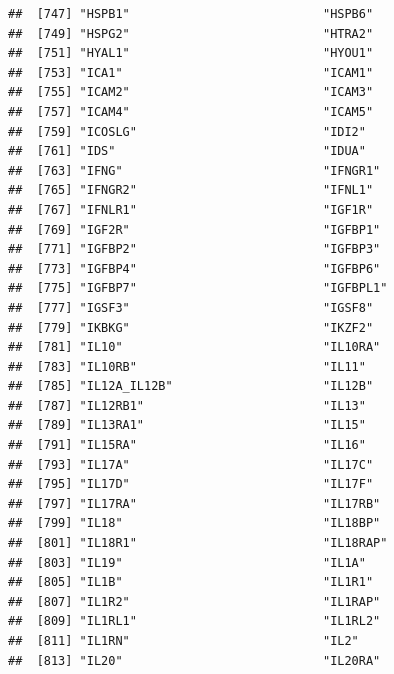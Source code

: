 \documentclass[
]{article}
\begin{document}
\begin{verbatim}
##  [747] "HSPB1"                           "HSPB6"                          
##  [749] "HSPG2"                           "HTRA2"                          
##  [751] "HYAL1"                           "HYOU1"                          
##  [753] "ICA1"                            "ICAM1"                          
##  [755] "ICAM2"                           "ICAM3"                          
##  [757] "ICAM4"                           "ICAM5"                          
##  [759] "ICOSLG"                          "IDI2"                           
##  [761] "IDS"                             "IDUA"                           
##  [763] "IFNG"                            "IFNGR1"                         
##  [765] "IFNGR2"                          "IFNL1"                          
##  [767] "IFNLR1"                          "IGF1R"                          
##  [769] "IGF2R"                           "IGFBP1"                         
##  [771] "IGFBP2"                          "IGFBP3"                         
##  [773] "IGFBP4"                          "IGFBP6"                         
##  [775] "IGFBP7"                          "IGFBPL1"                        
##  [777] "IGSF3"                           "IGSF8"                          
##  [779] "IKBKG"                           "IKZF2"                          
##  [781] "IL10"                            "IL10RA"                         
##  [783] "IL10RB"                          "IL11"                           
##  [785] "IL12A_IL12B"                     "IL12B"                          
##  [787] "IL12RB1"                         "IL13"                           
##  [789] "IL13RA1"                         "IL15"                           
##  [791] "IL15RA"                          "IL16"                           
##  [793] "IL17A"                           "IL17C"                          
##  [795] "IL17D"                           "IL17F"                          
##  [797] "IL17RA"                          "IL17RB"                         
##  [799] "IL18"                            "IL18BP"                         
##  [801] "IL18R1"                          "IL18RAP"                        
##  [803] "IL19"                            "IL1A"                           
##  [805] "IL1B"                            "IL1R1"                          
##  [807] "IL1R2"                           "IL1RAP"                         
##  [809] "IL1RL1"                          "IL1RL2"                         
##  [811] "IL1RN"                           "IL2"                            
##  [813] "IL20"                            "IL20RA"                         

\end{verbatim}
\end{document}
